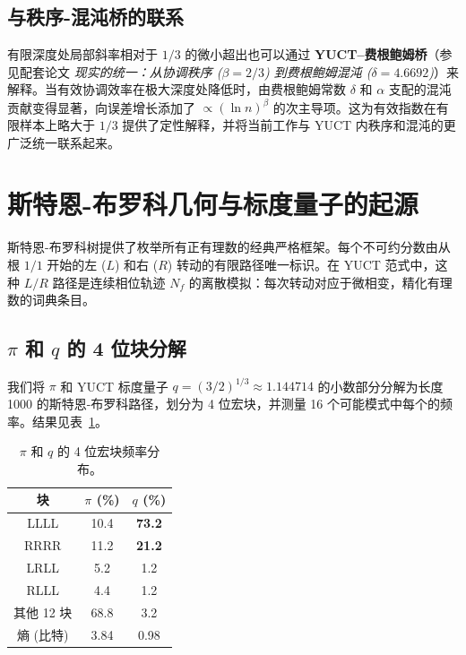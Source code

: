 \documentclass[11pt,a4paper]{article}
\begin{document}
	\subsection{与秩序-混沌桥的联系}
	有限深度处局部斜率相对于 \(1/3\) 的微小超出也可以通过 \textbf{YUCT–费根鲍姆桥}（参见配套论文 \emph{现实的统一：从协调秩序 (\(\beta=2/3\)) 到费根鲍姆混沌 (\(\delta=4.6692\))}）来解释。当有效协调效率在极大深度处降低时，由费根鲍姆常数 \(\delta\) 和 \(\alpha\) 支配的混沌贡献变得显著，向误差增长添加了 \(\propto (\ln n)^{\beta}\) 的次主导项。这为有效指数在有限样本上略大于 \(1/3\) 提供了定性解释，并将当前工作与 YUCT 内秩序和混沌的更广泛统一联系起来。
	
	\section{斯特恩-布罗科几何与标度量子的起源}
	\label{sec:stern-brocot}
	
	斯特恩-布罗科树提供了枚举所有正有理数的经典严格框架。每个不可约分数由从根 \(1/1\) 开始的左 (\(L\)) 和右 (\(R\)) 转动的有限路径唯一标识。在 YUCT 范式中，这种 \(L/R\) 路径是连续相位轨迹 \(N_f\) 的离散模拟：每次转动对应于微相变，精化有理数的词典条目。
	
	\subsection{\(\pi\) 和 \(q\) 的 4 位块分解}
	
	我们将 \(\pi\) 和 YUCT 标度量子 \(q = (3/2)^{1/3} \approx 1.144714\) 的小数部分分解为长度 1000 的斯特恩-布罗科路径，划分为 4 位宏块，并测量 16 个可能模式中每个的频率。结果见表~\ref{tab:block-spectra}。
	
	\begin{table}[htbp]
		\centering
		\caption{\(\pi\) 和 \(q\) 的 4 位宏块频率分布。}
		\label{tab:block-spectra}
		\begin{tabular}{c c c}
			\toprule
			块 & \(\pi\) (\%) & \(q\) (\%) \\
			\midrule
			LLLL & 10.4 & \textbf{73.2} \\
			RRRR & 11.2 & \textbf{21.2} \\
			LRLL & 5.2 & 1.2 \\
			RLLL & 4.4 & 1.2 \\
			其他 12 块 & 68.8 & 3.2 \\
			\midrule
			熵 (比特) & 3.84 & 0.98 \\
			\bottomrule
		\end{tabular}
	\end{table}
	
\end{document}
